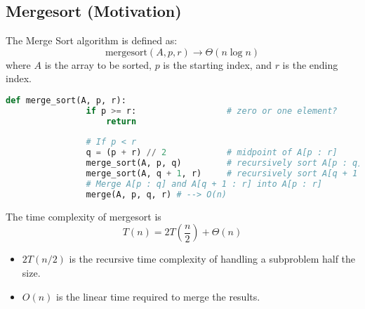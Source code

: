 \subsection{Mergesort (Motivation)}
    \begin{definition}
        The Merge Sort algorithm is defined as:
        \begin{equation}
            \text{mergesort}(A, p, r) \rightarrow \Theta (n \log n)
        \end{equation}
        where \( A \) is the array to be sorted, \( p \) is the starting index, and \( r \) is the ending index.   
       
        \begin{lstlisting}[language=Python, caption=Merge Sort Pseudocode]
            def merge_sort(A, p, r):
                if p >= r:                  # zero or one element?
                    return
                
                # If p < r
                q = (p + r) // 2            # midpoint of A[p : r] 
                merge_sort(A, p, q)         # recursively sort A[p : q] --> T(n/2)
                merge_sort(A, q + 1, r)     # recursively sort A[q + 1 : r] --> T(n/2)
                # Merge A[p : q] and A[q + 1 : r] into A[p : r]
                merge(A, p, q, r) # --> O(n)
        \end{lstlisting}   
        \vspace{1em}
        The time complexity of mergesort is
        \begin{equation}
            T(n) = 2T\left(\frac{n}{2}\right) + \Theta(n)
        \end{equation} 
        \begin{itemize}
            \item $2T(n/2)$ is the recursive time complexity of handling a subproblem half the size. 
            \item $O(n)$ is the linear time required to merge the results.
        \end{itemize}
    \end{definition}


